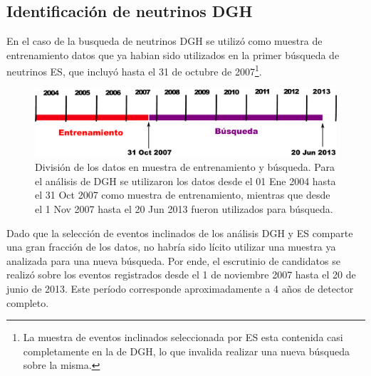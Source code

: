 	\subsection{Identificación de neutrinos DGH}
	
	En el caso de la busqueda de neutrinos DGH se utilizó como muestra de entrenamiento datos que ya habian sido utilizados en la primer búsqueda de neutrinos ES, que incluyó hasta el 31 de octubre de 2007\footnote{La muestra de eventos inclinados seleccionada por ES esta contenida casi completamente en la de DGH, lo que invalida realizar una nueva b\'usqueda sobre la misma.}.
	\begin{figure}[ht]
	\begin{center}
	\includegraphics[width=\textwidth]{fig/seleccionAuger/periodosDGH}
	\caption{División de los datos en muestra de entrenamiento y búsqueda. Para el análisis de DGH se utilizaron los datos desde el 01 Ene 2004 hasta el 31 Oct 2007 como muestra de entrenamiento, mientras que desde el 1 Nov 2007 hasta el 20 Jun 2013 fueron utilizados para búsqueda.}
	\label{fig:periodosDGH}
	\end{center}
	\end{figure}
	Dado que la selección de eventos inclinados de los análisis DGH y ES comparte una gran fracción de los datos, no habría sido lícito utilizar una muestra ya analizada para una nueva búsqueda.
	Por ende, el escrutinio de candidatos se realizó sobre los eventos registrados desde el 1 de noviembre 2007 hasta el 20 de junio de 2013.
	Este período corresponde aproximadamente a 4 años de detector completo.
	
